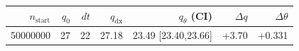 \begin{tabular}{r r r r r r r}
\hline
$n_{\mathrm{start}}$ & $q_0$ & $dt$ & $q_{\mathrm{dx}}$ & $q_{\theta}$ (CI) & $\Delta q$ & $\Delta\theta$ \\
\hline
50000000 & 27 & 22 & 27.18 & 23.49 [23.40,23.66] & +3.70 & +0.331 \\
\hline
\end{tabular}
